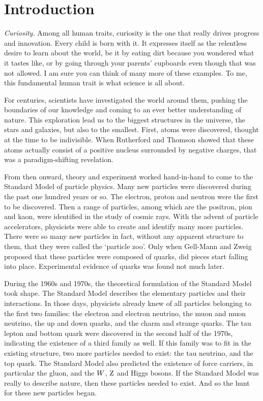 \chapter{Introduction \label{chap:introduction}}

\textit{Curiosity.} Among all human traits, curiosity is the one that really drives progress and
innovation. Every child is born with it. It expresses itself as the relentless desire to learn about
the world, be it by eating dirt because you wondered what it tastes like, or by going through your
parents' cupboards even though that was not allowed. I am sure you can think of many more of these
examples. 
To me, this fundamental human trait is what science is all about. 

For centuries, scientists have investigated the world around them, pushing the boundaries of
our knowledge and coming to an ever better understanding of nature.
This exploration lead us to the biggest structures in the universe, the stars and galaxies, but
also to the smallest. First, atoms were discovered, thought at the time to be indivisible.
When Rutherford and Thomson showed that these atoms actually consist of a positive nucleus
surrounded by negative charges, that was a paradigm-shifting revelation. 

From then onward, theory and experiment worked hand-in-hand to come to the Standard Model of
particle physics. Many new particles were discovered during the past one hundred years or so. 
The electron, proton and neutron were the first to be discovered. Then a range of particles,
among which are the positron, pion and kaon, were identified in the study of cosmic rays. 
With the advent of particle accelerators, physicists were able to create and identify many more
particles. There were so many new particles in fact, without any apparent structure to them, that
they were called the `particle zoo'. Only when Gell-Mann and Zweig proposed that these particles
were composed of quarks, did pieces start falling into place. Experimental evidence of quarks was
found not much later. 

During the 1960s and 1970s, the theoretical formulation of the Standard Model took shape. 
The Standard Model describes the elementary particles and their interactions. In those days,
physicists already knew of all particles belonging to the first two families: the electron and
electron neutrino, the muon and muon neutrino, the up and down quarks, and the charm and strange
quarks. The tau lepton and bottom quark were discovered in the second half of the 1970s, indicating
the existence of a third family as well. If this family was to fit in the existing structure, two
more particles needed to exist: the tau neutrino, and the top quark. 
The Standard Model also predicted the existence of force carriers, in particular the gluon, and
the $W$, $\mathrm{Z}$ and Higgs bosons. 
If the Standard Model was really to describe nature, then these particles needed to exist. And so
the hunt for these new particles began.

